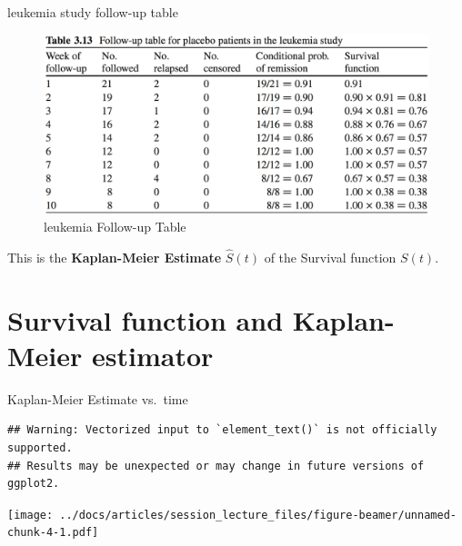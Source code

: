 \documentclass[
  ignorenonframetext,
]{beamer}
\begin{document}
\begin{frame}{leukemia study follow-up table}
\protect\hypertarget{leukemia-study-follow-up-table}{}

\begin{figure}
\centering
\includegraphics{figures/leukemiatable.png}
\caption{leukemia Follow-up Table}
\end{figure}

This is the \textbf{Kaplan-Meier Estimate} \(\hat S(t)\) of the Survival
function \(S(t)\).

\end{frame}

\hypertarget{survival-function-and-kaplan-meier-estimator}{%
\section{Survival function and Kaplan-Meier
estimator}\label{survival-function-and-kaplan-meier-estimator}}

\begin{frame}[fragile]{Kaplan-Meier Estimate vs.~time}
\protect\hypertarget{kaplan-meier-estimate-vs.-time}{}

\begin{verbatim}
## Warning: Vectorized input to `element_text()` is not officially supported.
## Results may be unexpected or may change in future versions of ggplot2.
\end{verbatim}

\texttt{[image: ../docs/articles/session\_lecture\_files/figure-beamer/unnamed-chunk-4-1.pdf]}

\end{frame}
\end{document}
